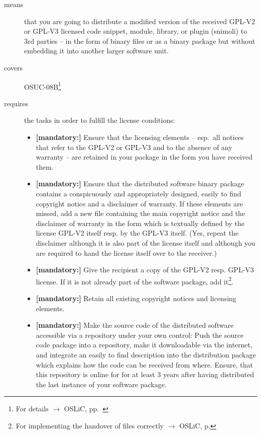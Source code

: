 \begin{description}
\item[means] that you are going to distribute a modified version of the received
GPL-V2 or GPL-V3 licensed code snippet, module, library, or plugin (snimoli) to
3rd parties -- in the form of binary files or as a binary package but without
embedding it into another larger software unit.
\item[covers] OSUC-08B\footnote{For details $\rightarrow$ OSLiC, pp.\
\pageref{OSUC-08B-DEF}}
\item[requires] the tasks in order to fulfill the license conditions:
\begin{itemize}

  \item \textbf{[mandatory:]} Ensure that the licensing elements -- esp.\ all
  notices that refer to the GPL-V2 or GPL-V3 and to the absence of any
  warranty -- are retained in your package in the form you have received them.

  \item \textbf{[mandatory:]} Ensure that the distributed software binary
  package contains a conspicuously and appropriately designed, easily to find
  copyright notice and a disclaimer of warranty. If these elements are missed,
  add a new file containing the main copyright notice and the disclaimer of
  warranty in the form which is textually defined by the license GPL-V2 itself
  resp. by the GPL-V3 itself. (Yes, repeat the disclaimer although it is also
  part of the license itself and although you are required to hand the license
  itself over to the receiver.)
  
  \item \textbf{[mandatory:]} Give the recipient a copy of the GPL-V2 resp.
  GPL-V3 license. If it is not already part of the software package, add
  it\footnote{For implementing the handover of files correctly $\rightarrow$
  OSLiC, p. \pageref{DistributingFilesHint}}.
  
  \item \textbf{[mandatory:]} Retain all existing copyright notices and
  licensing elements.

  \item \textbf{[mandatory:]} Make the source code of the distributed software
  accessible via a repository under your own control: Push the source code
  package into a repository, make it downloadable via the internet, and
  integrate an easily to find description into the distribution package which
  explains how the code can be received from where. Ensure, that this repository
  is online for for at least 3 years after having distributed the last instance
  of your software package.
  

\end{itemize}
\end{description}
